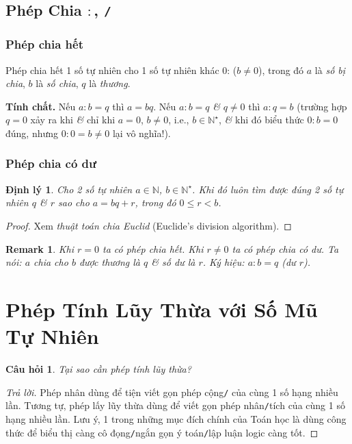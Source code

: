 \documentclass[oneside]{book}
\numberwithin{equation}{section}
\newtheorem{cauhoi}{Câu hỏi}[section]
\newtheorem{remark}{Remark}[section]
\newtheorem{dinhly}{Định lý}[section]
\begin{document}
\subsection{Phép Chia $:$, \texttt{/}}

\subsubsection{Phép chia hết}
Phép chia hết 1 số tự nhiên cho 1 số tự nhiên khác 0:  ($b\ne 0$), trong đó $a$ là \textit{số bị chia}, $b$ là \textit{số chia}, $q$ là \textit{thương}.

\noindent\textbf{Tính chất.} Nếu $a:b = q$ thì $a = bq$. Nếu $a:b = q$ \textit{\&} $q\ne 0$ thì $a:q = b$ (trường hợp $q = 0$ xảy ra khi \textit{\&} chỉ khi $a = 0$, $b\ne 0$, i.e., $b\in\mathbb{N}^\star$, \textit{\&} khi đó biểu thức $0:b = 0$ đúng, nhưng $0:0 = b\ne 0$ lại vô nghĩa!).

\subsubsection{Phép chia có dư}
\begin{dinhly}
	Cho 2 số tự nhiên $a\in\mathbb{N}$, $b\in\mathbb{N}^\star$. Khi đó luôn tìm được đúng 2 số tự nhiên $q$ \textit{\&} $r$ sao cho $a = bq + r$, trong đó $0\le r < b$.
\end{dinhly}

\begin{proof}[Proof]
	Xem \textit{thuật toán chia Euclid} (Euclide's division algorithm).
\end{proof}

\begin{remark}
	Khi $r = 0$ ta có phép chia hết. Khi $r\ne 0$ ta có phép chia có dư. Ta nói: $a$ chia cho $b$ được thương là $q$ \textit{\&} số dư là $r$. Ký hiệu: $a:b = q$ (dư $r$).
\end{remark}

\section{Phép Tính Lũy Thừa với Số Mũ Tự Nhiên}

\begin{cauhoi}
	Tại sao cần phép tính lũy thừa?
\end{cauhoi}

\begin{proof}[Trả lời]
	Phép nhân dùng để tiện viết gọn phép cộng\texttt{/} của cùng 1 số hạng nhiều lần. Tương tự, phép lấy lũy thừa dùng để viết gọn phép nhân\texttt{/}tích của cùng 1 số hạng nhiều lần. Lưu ý, 1 trong những mục đích chính của Toán học là dùng công thức để biểu thị càng cô đọng\texttt{/}ngắn gọn ý toán\texttt{/}lập luận logic càng tốt.
\end{proof}
\end{document}
